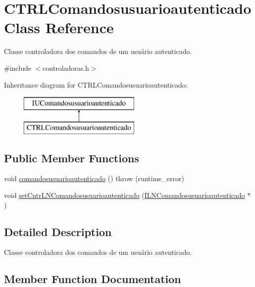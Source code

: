 \hypertarget{classCTRLComandosusuarioautenticado}{}\section{C\+T\+R\+L\+Comandosusuarioautenticado Class Reference}
\label{classCTRLComandosusuarioautenticado}


Classe controladora dos comandos de um usuário autenticado.  




{\ttfamily \#include $<$controladoras.\+h$>$}

Inheritance diagram for C\+T\+R\+L\+Comandosusuarioautenticado\+:\begin{figure}[H]
\begin{center}
\leavevmode
\includegraphics[height=2.000000cm]{classCTRLComandosusuarioautenticado}
\end{center}
\end{figure}
\subsection*{Public Member Functions}
\begin{DoxyCompactItemize}
\item 
void \hyperlink{classCTRLComandosusuarioautenticado_a6c0ee44bfadcf9854fca6fcf4e3379c2}{comandosusuarioautenticado} ()  throw (runtime\+\_\+error)
\item 
void \hyperlink{classCTRLComandosusuarioautenticado_a921e8dec09b5861ea96b737b673ab785}{set\+Cntr\+L\+N\+Comandosusuarioautenticado} (\hyperlink{classILNComandosusuarioautenticado}{I\+L\+N\+Comandosusuarioautenticado} $\ast$)
\end{DoxyCompactItemize}


\subsection{Detailed Description}
Classe controladora dos comandos de um usuário autenticado. 

\subsection{Member Function Documentation}
\mbox{\label{classCTRLComandosusuarioautenticado_a6c0ee44bfadcf9854fca6fcf4e3379c2}} 

